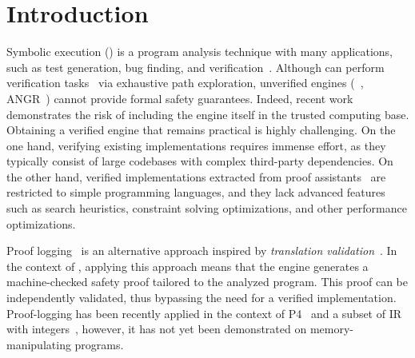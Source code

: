 \section{Introduction}



Symbolic execution (\SE) is a program analysis technique with many applications,
such as test generation, bug finding, and verification~\cite{CadarSen13,klee,exe,spf,bugredux,puasuareanu2004verification,se-numerical-2006,syminfer}.
Although \SE can perform verification tasks~\cite{puasuareanu2004verification,verifast,viper,c0-symex} via exhaustive path exploration,
unverified \SE engines (\eg \klee~\cite{klee}, ANGR~\cite{angr}) cannot provide formal safety guarantees.
Indeed, recent work \cite{klee-rocq} demonstrates the risk of including the \SE engine itself in the trusted computing base.
Obtaining a verified \SE engine that remains practical is highly challenging.
On the one hand,
verifying existing implementations requires immense effort,
as they typically consist of large codebases with complex third-party dependencies.
On the other hand,
verified implementations extracted from proof assistants~\cite{fse23wise,icfp22:keuchel} are restricted to simple programming languages,
and they lack advanced features such as search heuristics, constraint solving optimizations, and other performance optimizations.

Proof logging~\cite{lundberg2024proof,klee-rocq,armand2011modular,ekici2017smtcoq,de2008proofs,marx2013proof,flippo2024multi,mcilree2024proof,van2025efficient}
is an alternative approach inspired by \emph{translation validation}~\cite{samet,pnueli1998translation}.
In the context of \SE,
applying this approach means that the \SE engine generates a machine-checked safety proof tailored to the analyzed program.
This proof can be independently validated,
thus bypassing the need for a verified implementation.
Proof-logging \SE has been recently applied in the context of P4~\cite{lundberg2024proof} and a subset of \llvm IR with integers~\cite{klee-rocq},
however, it has not yet been demonstrated on memory-manipulating programs.

